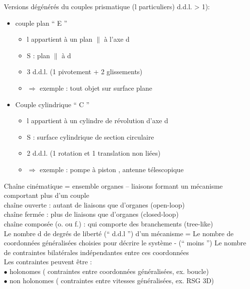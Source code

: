 Versions {\color{red}dégénérés} du couples prismatique (l particuliers) d.d.l. > 1):\\
\begin{itemize}
\renewcommand{\labelitemi}{$\circ$}
\renewcommand{\labelitemii}{$\cdot$}
\item{{\color{orange}couple plan “ E ”}}
\begin{itemize}
\item{l appartient à un plan $\parallel$ à l’axe d}
\item{S : plan $\parallel$ à d}
\item{3 d.d.l. (1 pivotement + 2 glissements)}
\item{$\Rightarrow$ exemple : tout objet sur surface plane}
\end{itemize}
\item{{\color{orange}Couple cylindrique “ C ”}}
\begin{itemize}
\item{l appartient à un cylindre de révolution d’axe d}
\item{S : surface cylindrique de section circulaire}
\item{2 d.d.l. (1 rotation et 1 translation non liées)}
\item{$\Rightarrow$ exemple : pompe à piston , antenne télescopique}\\
\end{itemize}
\end{itemize}

{\color{orange}Chaîne cinématique} = ensemble {organes – liaisons} formant un mécanisme comportant plus d’un couple\\
chaîne {\color{orange}ouverte} : autant de liaisons que d’organes (open-loop)\\
chaîne {\color{orange}fermée} : plus de liaisons que d’organes (closed-loop)\\
chaîne {\color{orange}composée} (o. ou f.) : qui comporte des branchements (tree-like)\\

Le nombre d de degrés de liberté (“ d.d.l ”) d’un mécanisme = Le nombre de {\color{orange}coordonnées généralisées} choisies pour décrire le système - (“ moins ”) Le nombre de {\color{orange}contraintes bilatérales indépendantes} entre ces coordonnées\\

Les {\color{orange}contraintes} peuvent être :\\
$\bullet$ {\color{orange}holonomes} ( contraintes entre coordonnées généralisées, ex. boucle)\\
$\bullet$ {\color{orange}non holonomes} ( contraintes entre vitesses généralisées, ex. RSG 3D) \\

